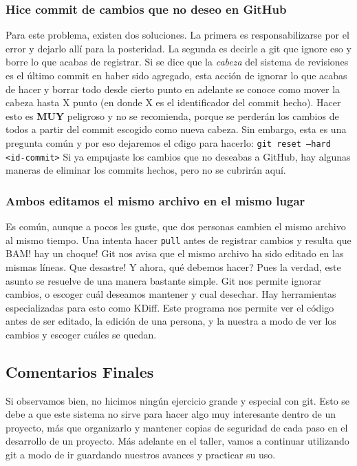 \documentclass[10pt,letterpaper]{article}
\newcommand{\inlinecode}[1]{
\colorbox{light-gray}{\texttt{#1}}
}
\begin{document}
\subsubsection{Hice commit de cambios que no deseo en GitHub}
Para este problema, existen dos soluciones. La primera es responsabilizarse por el error y dejarlo all\'i para la posteridad. La segunda es decirle a git que ignore eso y borre lo que acabas de registrar. Si se dice que la \emph{cabeza} del sistema de revisiones es el \'ultimo commit en haber sido agregado, esta acci\'on de ignorar lo que acabas de hacer y borrar todo desde cierto punto en adelante se conoce como mover la cabeza hasta X punto (en donde X es el identificador del commit hecho). Hacer esto es \textbf{MUY} peligroso y no se recomienda, porque se perder\'an los cambios de todos a partir del commit escogido como nueva cabeza. Sin embargo, esta es una pregunta com\'un y por eso dejaremos el c\'digo para hacerlo: \inlinecode{git reset --hard <id-commit>} Si ya empujaste los cambios que no deseabas a GitHub, hay algunas maneras de eliminar los commits hechos, pero no se cubrir\'an aqu\'i.

\subsubsection{Ambos editamos el mismo archivo en el mismo lugar}
Es com\'un, aunque a pocos les guste, que dos personas cambien el mismo archivo al mismo tiempo. Una intenta hacer \inlinecode{pull} antes de registrar cambios y resulta que BAM! hay un choque! Git nos avisa que el mismo archivo ha sido editado en las mismas l\'ineas. Que desastre! Y ahora, qu\'e debemos hacer? Pues la verdad, este asunto se resuelve de una manera bastante simple. Git nos permite ignorar cambios, o escoger cu\'al deseamos mantener y cual desechar. Hay herramientas especializadas para esto como KDiff. Este programa nos permite ver el c\'odigo antes de ser editado, la edici\'on de una persona, y la nuestra a modo de ver los cambios y escoger cu\'ales se quedan.

\subsection{Comentarios Finales}
Si observamos bien, no hicimos ning\'un ejercicio grande y especial con git. Esto se debe a que este sistema no sirve para hacer algo muy interesante dentro de un proyecto, m\'as que organizarlo y mantener copias de seguridad de cada paso en el desarrollo de un proyecto. M\'as adelante en el taller, vamos a continuar utilizando git a modo de ir guardando nuestros avances y practicar su uso.\\
\end{document}

